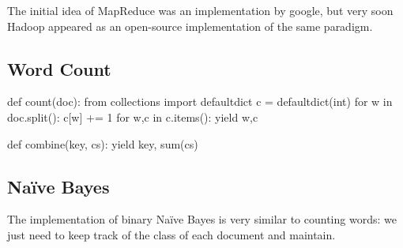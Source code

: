 The initial idea of MapReduce was an implementation by google, but very soon
Hadoop appeared as an open-source implementation of the same paradigm.

\subsection{Word Count}

\begin{python}
def count(doc):
    from collections import defaultdict
    c = defaultdict(int)
    for w in doc.split():
        c[w] += 1
    for w,c in c.items():
        yield w,c

def combine(key, cs):
    yield key, sum(cs)

\end{python}


\subsection{Naïve Bayes}

The implementation of binary Naïve Bayes is very similar to counting words: we just
need to keep track of the class of each document and maintain.

